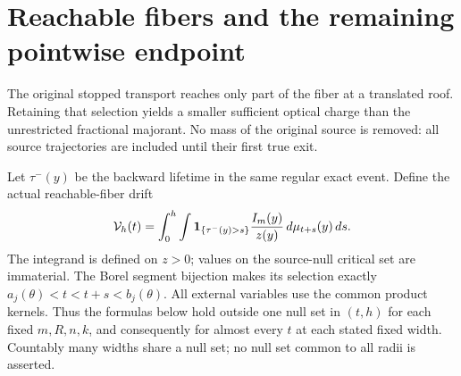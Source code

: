 \section{Reachable fibers and the remaining pointwise endpoint}
\label{sec:v86-causal}
The original stopped transport reaches only part of the fiber at a
translated roof. Retaining that selection yields a smaller sufficient
optical charge than the unrestricted fractional majorant. No mass of
the original source is removed: all source trajectories are included
until their first true exit.

Let $\tau^-(y)$ be the backward lifetime in the same regular exact
event. Define the actual reachable-fiber drift
\begin{equation}\label{eq:v86-causal-drift}
 \mathcal V_h(t)=\int_0^h\int
 \one_{\{\tau^-(y)>s\}}\frac{I_m(y)}{z(y)}\,d\mu_{t+s}(y)\,ds.
\end{equation}
The integrand is defined on $z>0$; values on the source-null critical
set are immaterial. The Borel segment bijection makes its selection
exactly $a_j(\theta)<t<t+s<b_j(\theta)$. All external variables
use the common product kernels. Thus the formulas below hold outside
one null set in $(t,h)$ for each fixed $m,R,n,k$, and consequently
for almost every $t$ at each stated fixed width. Countably many
widths share a null set; no null set common to all radii is asserted.

